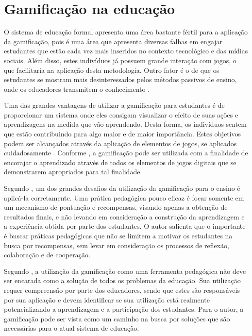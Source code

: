 \documentclass[
	12pt,				%
	oneside,			%
	a4paper,			%
	english,			%
	french,				%
	spanish,			%
	brazil,				%
	]{abntex2}
\begin{document}
\section{Gamificação na educação}

O sistema de educação formal apresenta uma área bastante fértil para a aplicação da gamificação, pois é uma área que apresenta diversas falhas em engajar estudantes que estão cada vez mais inseridos no contexto tecnológico e das mídias sociais. Além disso, estes indivíduos já possuem grande interação com jogos, o que facilitaria na aplicação desta metodologia. Outro fator é o de que os estudantes se mostram mais desinteressados pelos métodos passivos de ensino, onde os educadores transmitem o conhecimento \cite{fardo2013gamificaccao}. 

Uma das grandes vantagens de utilizar a gamificação para estudantes é de proporcionar um sistema onde eles consigam visualizar o efeito de suas ações e aprendizagens na medida que vão aprendendo. Desta forma, os indivíduos sentem que estão contribuindo para algo maior e de maior importância. Estes objetivos podem ser alcançados através da aplicação de elementos de jogos, se aplicados cuidadosamente \cite{fardo2013gamificaccao}. Conforme \citet{kaap:2014}, a gamificação pode ser utilizada com a finalidade de encorajar o aprendizado através de todos os elementos de jogos digitais que se demonstrarem apropriados para tal finalidade.  

Segundo \citet{fardo2013gamificaccao}, um dos grandes desafios da utilização da gamificação para o ensino é aplicá-la corretamente. Uma prática pedagógica pouco eficaz é focar somente em um mecanismo de pontuação e recompensas, visando apenas a obtenção de resultados finais, e não levando em consideração a construção da aprendizagem e a experiência obtida por parte dos estudantes. O autor salienta que o importante é buscar práticas pedagógicas que não se limitem a motivar os estudantes na busca por recompensas, sem levar em consideração os processos de reflexão, colaboração e de cooperação.

Segundo \citet{fardo2013gamificaccao}, a utilização da gamificação como uma ferramenta pedagógica não deve ser encarada como a solução de todos os problemas da educação. Sua utilização requer compreensão por parte dos educadores, sendo que estes são responsáveis por sua aplicação e devem identificar se sua utilização está realmente potencializando a aprendizagem e a participação dos estudantes. Para o autor, a gamificação pode ser vista como um caminho na busca por soluções que são necessárias para o atual sistema de educação.
\end{document}
